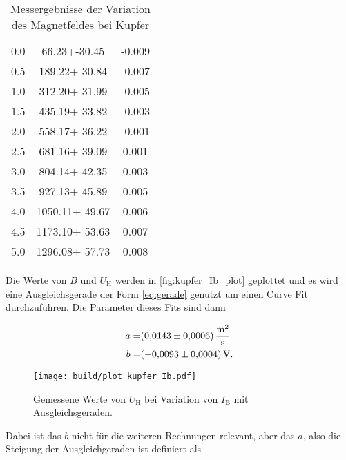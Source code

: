 \begin{table}
    \centering
    \caption{Messergebnisse der Variation des Magnetfeldes bei Kupfer}
    \label{tab:werte_kupfer_B}
    \begin{tabular}{S[table-format=1.1] S[table-format=4.2+-2.2] S[table-format=-1.3]}
        \toprule
         &  &  \\
         & 66.23+-30.45 & -0.009\\
        0.5 & 189.22+-30.84 & -0.007\\
        1.0 & 312.20+-31.99 & -0.005\\
        1.5 & 435.19+-33.82 & -0.003\\
        2.0 & 558.17+-36.22 & -0.001\\
        2.5 & 681.16+-39.09 & 0.001\\
        3.0 & 804.14+-42.35 & 0.003\\
        3.5 & 927.13+-45.89 & 0.005\\
        4.0 & 1050.11+-49.67 & 0.006\\
        4.5 & 1173.10+-53.63 & 0.007\\
        5.0 & 1296.08+-57.73 & 0.008\\
        \bottomrule
    \end{tabular}
\end{table}

Die Werte von $B$ und $U_\text{H}$ werden in \autoref{fig:kupfer_Ib_plot} geplottet und es wird eine Ausgleichsgerade der Form \autoref{eq:gerade} genutzt um einen Curve Fit durchzuführen.
Die Parameter dieses Fits sind dann

\begin{align*}
    a =& \SI{0.0143+-0.0006}{\meter\squared\per\second} \\
    b =& \SI{-0.0093+-0.0004}{\volt}.
    \label{eq:params_Ib}
\end{align*}

\begin{figure}
    \centering
    \texttt{[image: build/plot\_kupfer\_Ib.pdf]}
    \caption{Gemessene Werte von $U_\text{H}$ bei Variation von $I_\text{B}$ mit Ausgleichsgeraden.\cite{numpy}}
    \label{fig:kupfer_Ib_plot}
\end{figure}

Dabei ist das $b$ nicht für die weiteren Rechnungen relevant, aber das $a$, also die Steigung der Ausgleichgeraden ist definiert als

